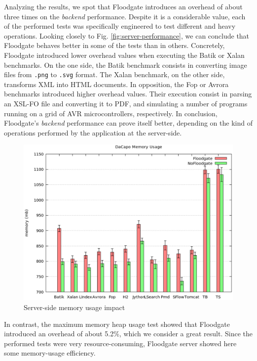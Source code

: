 Analyzing the results, we spot that Floodgate introduces an overhead of about three times on the \textit{backend} performance. Despite it is a considerable value, each of the performed tests was specifically engineered to test different and heavy operations. Looking closely to Fig. \ref{fig:server-performance}, we can conclude that Floodgate behaves better in some of the tests than in others. Concretely, Floodgate introduced lower overhead values when executing the Batik or Xalan benchmarks. On the one side, the Batik benchmark consists in converting image files from \texttt{.png} to \texttt{.svg} format. The Xalan benchmark, on the other side, transforms XML into HTML documents. In opposition, the Fop or Avrora benchmarks introduced higher overhead values. Their execution consist in parsing an XSL-FO file and converting it to PDF, and simulating a number of programs running on a grid of AVR microcontrollers, respectively. In conclusion, Floodgate's \textit{backend} performance can prove itself better, depending on the kind of operations performed by the application at the server-side.

\begin{figure}[t!]
\includegraphics[width=\textwidth]{figs/server-memory}
\centering
\caption{Server-side memory usage impact}
\label{fig:server-memory}
\end{figure}

In contrast, the maximum memory heap usage test showed that Floodgate introduced an overhead of about 5.2\%, which we consider a great result. Since the performed tests were very resource-consuming, Floodgate server showed here some memory-usage efficiency.

